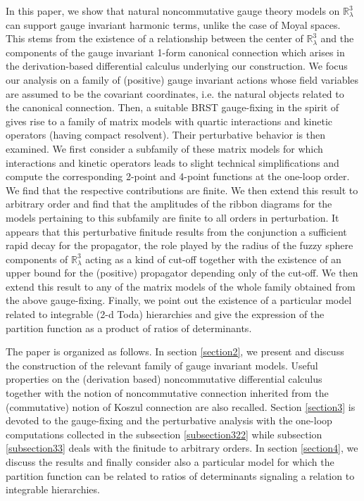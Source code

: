 \documentclass[a4paper,11pt,twoside]{article}
\numberwithin{equation}{section}
\theoremstyle{nonumberplain}
\newcounter{and}
\begin{document}
In this paper, we show that natural noncommutative gauge theory models on $\mathbb{R}^3_\lambda$ can support gauge invariant harmonic terms, unlike the case of Moyal spaces. This stems from the existence of a relationship between the center of $\mathbb{R}^3_\lambda$ and the components of the gauge invariant 1-form canonical connection which arises in the derivation-based differential calculus underlying our construction. We focus our analysis on a family of (positive) gauge invariant actions whose field variables are assumed to be the covariant coordinates, i.e. the natural objects related to the canonical connection. Then, a suitable BRST gauge-fixing in the spirit of \cite{MVW13, stor-wal} gives rise to a family of matrix models with quartic interactions and kinetic operators (having compact resolvent). Their perturbative behavior is then examined. We first consider a subfamily of these matrix models for which interactions and kinetic operators leads to slight technical simplifications and compute the corresponding 2-point and 4-point functions at the one-loop order. We find that the respective contributions are finite. We then extend this result to arbitrary order and find that the amplitudes of the ribbon diagrams for the models pertaining to this subfamily are finite to all orders in perturbation. It appears that this perturbative finitude results from the conjunction a sufficient rapid decay for the propagator, the role played by the radius of the fuzzy sphere components of $\mathbb{R}^3_\lambda$ acting as a kind of cut-off together with the existence of an upper bound for the (positive) propagator depending only of the cut-off. We then extend this result to any of the matrix models of the whole family obtained from the above gauge-fixing. Finally, we point out the existence of a particular model related to integrable (2-d Toda) hierarchies and give the expression of the partition function as a product of ratios of determinants.\par

The paper is organized as follows. In section \ref{section2}, we present and discuss the construction of the relevant family of gauge invariant models. Useful properties on the (derivation based) noncommutative differential calculus together with the notion of noncommutative connection inherited from the (commutative) notion of Koszul connection are also recalled. Section \ref{section3} is devoted to the gauge-fixing and the perturbative analysis with the one-loop computations collected in the subsection \ref{subsection322} while subsection \ref{subsection33} deals with the finitude to arbitrary orders. In section \ref{section4}, we discuss the results and finally consider also a particular model for which the partition function can be related to ratios of determinants signaling a relation to integrable hierarchies.
\end{document}
